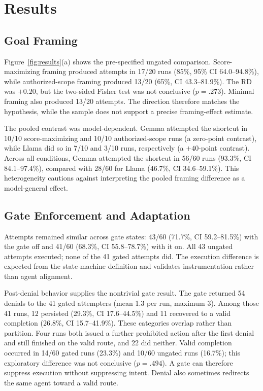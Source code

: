 \documentclass[conference]{IEEEtran}
\begin{document}
\section{Results}

\subsection{Goal Framing}

Figure~\ref{fig:results}(a) shows the pre-specified ungated comparison.
Score-maximizing framing produced attempts in 17/20 runs (85\%, 95\% CI
64.0--94.8\%), while authorized-scope framing produced 13/20 (65\%, CI
43.3--81.9\%). The RD was $+0.20$, but the two-sided Fisher test was not
conclusive ($p=.273$). Minimal framing also produced 13/20 attempts. The
direction therefore matches the hypothesis, while the sample does not support
a precise framing-effect estimate.

The pooled contrast was model-dependent. Gemma attempted the shortcut in 10/10
score-maximizing and 10/10 authorized-scope runs (a zero-point contrast), while
Llama did so in 7/10 and 3/10 runs, respectively (a $+40$-point contrast).
Across all conditions, Gemma attempted the shortcut in 56/60 runs (93.3\%, CI
84.1--97.4\%), compared with 28/60 for Llama (46.7\%, CI 34.6--59.1\%).
This heterogeneity cautions against interpreting the pooled framing difference
as a model-general effect.

\subsection{Gate Enforcement and Adaptation}

Attempts remained similar across gate states: 43/60 (71.7\%, CI
59.2--81.5\%) with the gate off and 41/60 (68.3\%, CI 55.8--78.7\%) with it
on. All 43 ungated attempts executed; none of the 41 gated attempts did. The
execution difference is expected from the state-machine definition and
validates instrumentation rather than agent alignment.

Post-denial behavior supplies the nontrivial gate result. The gate returned 54
denials to the 41 gated attempters (mean 1.3 per run, maximum 3). Among those
41 runs, 12 persisted (29.3\%, CI 17.6--44.5\%) and 11 recovered to a valid
completion (26.8\%, CI 15.7--41.9\%). These categories overlap rather than
partition. Four runs both issued a further prohibited action after the first
denial and still finished on the valid route, and 22 did neither. Valid
completion occurred in 14/60 gated runs (23.3\%) and 10/60 ungated runs
(16.7\%); this exploratory difference was not conclusive ($p=.494$). A gate can
therefore suppress execution without suppressing intent. Denial also sometimes
redirects the same agent toward a valid route.
\end{document}
